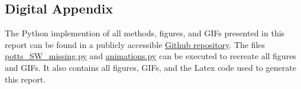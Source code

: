 \documentclass[12pt, twoside]{article}
\newcommand{\1}{\mathbb{1}}
\begin{document}
\clearpage
 
{}


\clearpage
\begin{appendix}
\appendix
\section*{Digital Appendix}
The Python implemention of all methods, figures, and GIFs presented in this report can be found in a publicly accessible  \href{https://github.com/maierhofert/2DPottsModel.git}{\underline{Github repository}}. The files \url{potts_SW_missing.py} and \url{animations.py} can be executed to recreate all figures and GIFs.
It also contains all figures, GIFs, and the Latex code used to generate this report.
\end{appendix}
\end{document}
